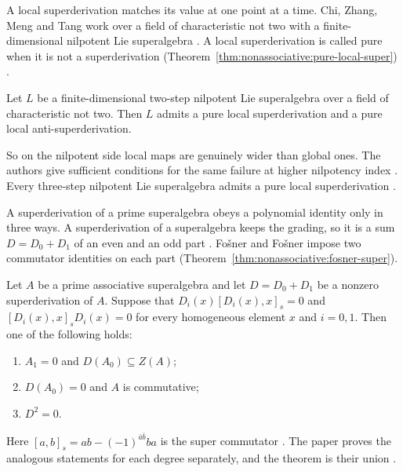 A local superderivation matches its value at one point at a time.
Chi, Zhang, Meng and Tang work over a field of characteristic not two with
a finite-dimensional nilpotent Lie superalgebra
\cite[p.~1]{ChiZhangMengTang2026}. A local superderivation is called pure
when it is not a superderivation (Theorem~\ref{thm:nonassociative:pure-local-super}) \cite[p.~1]{ChiZhangMengTang2026}.

\begin{theorem}\label{thm:nonassociative:pure-local-super}
Let $L$ be a finite-dimensional two-step nilpotent Lie superalgebra over a
field of characteristic not two. Then $L$ admits a pure local
superderivation and a pure local anti-superderivation.
\end{theorem}

So on the nilpotent side local maps are genuinely wider than global ones.
The authors give sufficient conditions for the same failure at higher
nilpotency index \cite[p.~1]{ChiZhangMengTang2026}. Every three-step
nilpotent Lie superalgebra admits a pure local superderivation
\cite[Theorem~4.2, p.~15]{ChiZhangMengTang2026}.

A superderivation of a prime superalgebra obeys a polynomial identity only in
three ways. A superderivation of a superalgebra keeps the grading, so it is a
sum $D=D_0+D_1$ of an even and an odd part \cite[p.~304]{FosnerFosner2014}.
Fošner and Fošner impose two commutator identities on each part (Theorem~\ref{thm:nonassociative:fosner-super}).

\begin{theorem}\label{thm:nonassociative:fosner-super}
Let $A$ be a prime associative superalgebra and let $D=D_0+D_1$ be a nonzero
superderivation of $A$. Suppose that
$D_i(x)[D_i(x),x]_s=0$ and $[D_i(x),x]_sD_i(x)=0$ for every homogeneous
element $x$ and $i=0,1$. Then one of the following holds:
\begin{enumerate}
\item $A_1=0$ and $D(A_0)\subseteq Z(A)$;
\item $D(A_0)=0$ and $A$ is commutative;
\item $D^{2}=0$.
\end{enumerate}
\end{theorem}

Here $[a,b]_s=ab-(-1)^{\bar a\bar b}ba$ is the super commutator
\cite[p.~304]{FosnerFosner2014}. The paper proves the analogous statements for
each degree separately, and the theorem is their union
\cite[Propositions~1--2, pp.~305--306]{FosnerFosner2014}.

